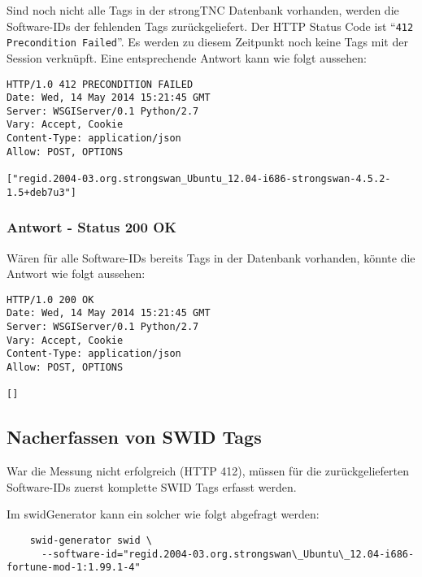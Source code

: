 \documentclass[10pt,a4paper]{scrartcl}
\begin{document}
Sind noch nicht alle Tags in der strongTNC Datenbank vorhanden, werden die
Software-IDs der fehlenden Tags zurückgeliefert. Der HTTP Status Code ist
``\texttt{412 Precondition Failed}''. Es werden zu diesem Zeitpunkt noch keine
Tags mit der Session verknüpft. Eine entsprechende Antwort kann wie folgt
aussehen:

\begin{small}\begin{lstlisting}
HTTP/1.0 412 PRECONDITION FAILED
Date: Wed, 14 May 2014 15:21:45 GMT
Server: WSGIServer/0.1 Python/2.7
Vary: Accept, Cookie
Content-Type: application/json
Allow: POST, OPTIONS

["regid.2004-03.org.strongswan_Ubuntu_12.04-i686-strongswan-4.5.2-1.5+deb7u3"]
\end{lstlisting}\end{small}

\subsubsection{Antwort - Status 200 OK}

Wären für alle Software-IDs bereits Tags in der Datenbank vorhanden, könnte die Antwort wie folgt aussehen:

\begin{small}\begin{lstlisting}
HTTP/1.0 200 OK
Date: Wed, 14 May 2014 15:21:45 GMT
Server: WSGIServer/0.1 Python/2.7
Vary: Accept, Cookie
Content-Type: application/json
Allow: POST, OPTIONS

[]
\end{lstlisting}\end{small}

\subsection{Nacherfassen von SWID Tags}

War die Messung nicht erfolgreich (HTTP 412), müssen für die zurückgelieferten
Software-IDs zuerst komplette SWID Tags erfasst werden.

Im swidGenerator kann ein solcher wie folgt abgefragt werden:

\begin{small}\begin{verbatim}
	swid-generator swid \
	  --software-id="regid.2004-03.org.strongswan\_Ubuntu\_12.04-i686-fortune-mod-1:1.99.1-4"
\end{verbatim}\end{small}
\end{document}
